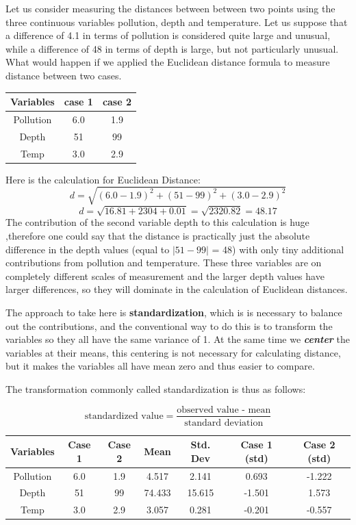 \documentclass[a4paper,12pt]{report}
\begin{document}
Let us consider measuring the distances between between two points using
the three continuous variables pollution, depth and temperature. Let us suppose that a difference of 4.1 in terms of pollution is considered quite large and unusual, while a difference of 48 in terms of depth is large, but not particularly unusual.
What would happen if we applied the Euclidean distance formula to measure distance between two cases.
\begin{center}
	\begin{tabular}{|c|c|c|}
		\hline
		Variables & case 1 & case 2 \\ \hline 
		Pollution & 6.0 & 1.9 \\
		Depth & 51 & 99 \\
		Temp & 3.0 & 2.9 \\
		\hline
	\end{tabular}
\end{center}

Here is the calculation for Euclidean Distance:
\[ d = \sqrt{(6.0 - 1.9)^2 + (51 - 99)^2 + (3.0 - 2.9)^2}   \]
\[ d = \sqrt{16.81 + 2304 + 0.01} = \sqrt{2320.82} = 48.17 \]
\noindent The contribution of the second variable depth to this calculation is huge ,therefore one could say
that the distance is practically just the absolute difference in the depth values (equal to
$|51-99|$ = 48) with only tiny additional contributions from pollution and temperature. These three variables are on
completely different scales of measurement and the larger depth values have larger differences, so they will dominate in the calculation of Euclidean distances.


\noindent The approach to take here is \textbf{standardization}, which is is necessary to balance out the contributions, and the
conventional way to do this is to transform the variables so they all have the same variance
of 1. At the same time we \textbf{\textit{center}} the variables at their means, this centering is not
necessary for calculating distance, but it makes the variables all have mean zero and thus
easier to compare. 

\noindent The transformation commonly called standardization is thus as follows:

\[\mbox{standardized value} = \frac{\mbox{observed value - mean}}{ \mbox{standard deviation}}\]
\begin{center}
	\begin{tabular}{|c|c|c|c|c|c|c|}
		\hline
		Variables & Case 1 & Case 2 & Mean & Std. Dev & Case 1 (std) & Case 2 (std) \\ \hline
		Pollution & 6.0 & 1.9 & 4.517	&	2.141	&	0.693	&	-1.222	\\
		Depth & 51 & 99 & 74.433	&	15.615	&	-1.501	&	1.573	\\
		Temp & 3.0 & 2.9 & 3.057	&	0.281	&	-0.201	&	-0.557	\\
		\hline
	\end{tabular}
\end{center}
\end{document}
